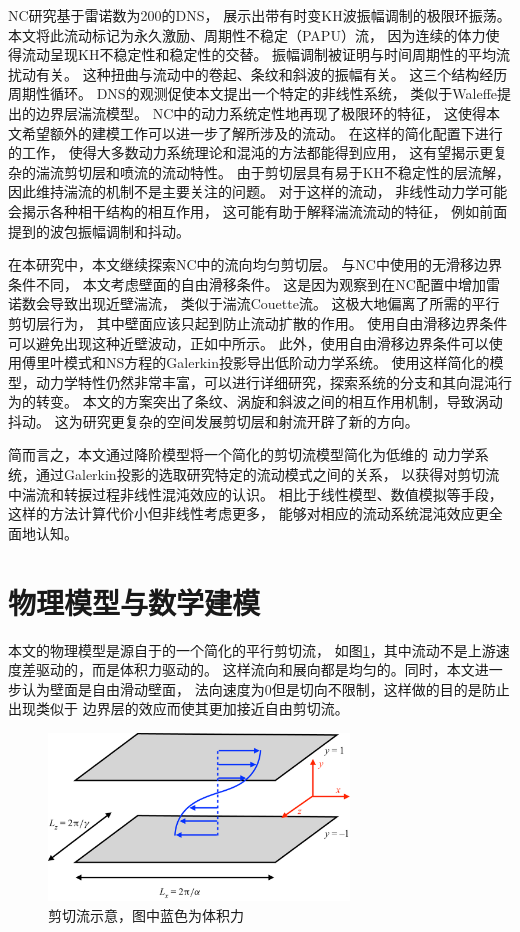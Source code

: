 \documentclass[UTF8,zihao=5]{ctexart} %
\begin{document}
NC研究基于雷诺数为200的DNS，
展示出带有时变KH波振幅调制的极限环振荡。
本文将此流动标记为永久激励、周期性不稳定（PAPU）流，
因为连续的体力使得流动呈现KH不稳定性和稳定性的交替。
振幅调制被证明与时间周期性的平均流扰动有关。
这种扭曲与流动中的卷起、条纹和斜波的振幅有关。
这三个结构经历周期性循环。
DNS的观测促使本文提出一个特定的非线性系统，
类似于Waleffe\cite{waleffe1995transition}提出的边界层湍流模型。
NC中的动力系统定性地再现了极限环的特征，
这使得本文希望额外的建模工作可以进一步了解所涉及的流动。
在这样的简化配置下进行的工作，
使得大多数动力系统理论和混沌的方法都能得到应用，
这有望揭示更复杂的湍流剪切层和喷流的流动特性。
由于剪切层具有易于KH不稳定性的层流解，
因此维持湍流的机制不是主要关注的问题。
对于这样的流动，
非线性动力学可能会揭示各种相干结构的相互作用，
这可能有助于解释湍流流动的特征，
例如前面提到的波包振幅调制和抖动。

在本研究中，本文继续探索NC中的流向均匀剪切层。
与NC中使用的无滑移边界条件不同，
本文考虑壁面的自由滑移条件。
这是因为观察到在NC配置中增加雷诺数会导致出现近壁湍流，
类似于湍流Couette流。
这极大地偏离了所需的平行剪切层行为，
其中壁面应该只起到防止流动扩散的作用。
使用自由滑移边界条件可以避免出现这种近壁波动，正如\cite{chantry2016turbulent}中所示。
此外，使用自由滑移边界条件可以使用傅里叶模式和NS方程的Galerkin投影导出低阶动力学系统。
使用这样简化的模型，动力学特性仍然非常丰富，可以进行详细研究，探索系统的分支和其向混沌行为的转变。
本文的方案突出了条纹、涡旋和斜波之间的相互作用机制，导致涡动抖动。
这为研究更复杂的空间发展剪切层和射流开辟了新的方向。

简而言之，本文通过降阶模型将一个简化的剪切流模型简化为低维的
动力学系统，通过Galerkin投影的选取研究特定的流动模式之间的关系，
以获得对剪切流中湍流和转捩过程非线性混沌效应的认识。
相比于线性模型、数值模拟等手段，这样的方法计算代价小但非线性考虑更多，
能够对相应的流动系统混沌效应更全面地认知。

\section{物理模型与数学建模}

本文的物理模型是源自于\cite{nogueira2021dynamics}的一个简化的平行剪切流，
如图\ref{fig:flow}，其中流动不是上游速度差驱动的，而是体积力驱动的。
这样流向和展向都是均匀的。同时，本文进一步认为壁面是自由滑动壁面，
法向速度为0但是切向不限制，这样做的目的是防止出现类似于
边界层的效应而使其更加接近自由剪切流。

\begin{figure}[H]
    \centering
    \includegraphics[width=8cm]{flow.png}  %
    \caption{剪切流示意，图中蓝色为体积力}
    \label{fig:flow}
\end{figure}
\end{document}
